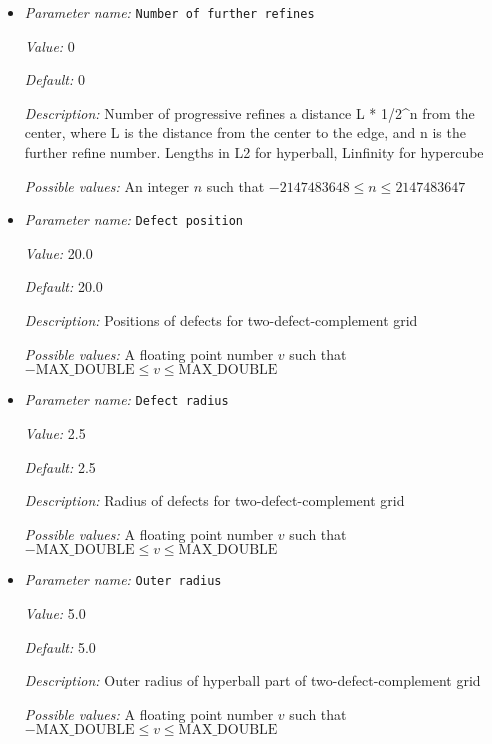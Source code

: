 \begin{itemize}
{\it Possible values:} An integer $n$ such that $-2147483648\leq n \leq 2147483647$
\item {\it Parameter name:} {\tt Number of further refines}
\label{parameters:NematicSystemMPIDriver/Grid/Number of further refines}
\label{parameters:NematicSystemMPIDriver/Grid/Number_20of_20further_20refines}


{\it Value:} 0


{\it Default:} 0


{\it Description:} Number of progressive refines a distance L * 1/2^n from the center, where L is the distance from the center to the edge, and n is the further refine  number. Lengths in L2 for hyperball, Linfinity for  hypercube


{\it Possible values:} An integer $n$ such that $-2147483648\leq n \leq 2147483647$
\item {\it Parameter name:} {\tt Defect position}
\label{parameters:NematicSystemMPIDriver/Grid/Defect position}
\label{parameters:NematicSystemMPIDriver/Grid/Defect_20position}


{\it Value:} 20.0


{\it Default:} 20.0


{\it Description:} Positions of defects for two-defect-complement grid


{\it Possible values:} A floating point number $v$ such that $-\text{MAX\_DOUBLE} \leq v \leq \text{MAX\_DOUBLE}$
\item {\it Parameter name:} {\tt Defect radius}
\label{parameters:NematicSystemMPIDriver/Grid/Defect radius}
\label{parameters:NematicSystemMPIDriver/Grid/Defect_20radius}


{\it Value:} 2.5


{\it Default:} 2.5


{\it Description:} Radius of defects for two-defect-complement grid


{\it Possible values:} A floating point number $v$ such that $-\text{MAX\_DOUBLE} \leq v \leq \text{MAX\_DOUBLE}$
\item {\it Parameter name:} {\tt Outer radius}
\label{parameters:NematicSystemMPIDriver/Grid/Outer radius}
\label{parameters:NematicSystemMPIDriver/Grid/Outer_20radius}


{\it Value:} 5.0


{\it Default:} 5.0


{\it Description:} Outer radius of hyperball part of two-defect-complement grid


{\it Possible values:} A floating point number $v$ such that $-\text{MAX\_DOUBLE} \leq v \leq \text{MAX\_DOUBLE}$
\end{itemize}

